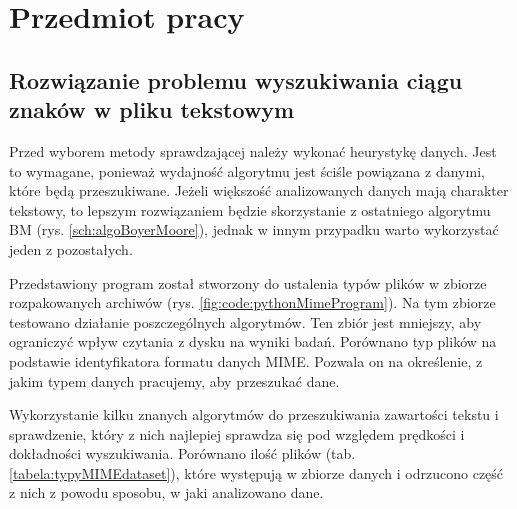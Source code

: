 \chapter{Przedmiot pracy}



\section{Rozwiązanie problemu wyszukiwania ciągu znaków w pliku tekstowym}

Przed wyborem metody sprawdzającej należy wykonać heurystykę danych. Jest to 
wymagane, ponieważ wydajność algorytmu jest ściśle powiązana z danymi, które
będą przeszukiwane. Jeżeli większość analizowanych danych mają charakter
tekstowy, to lepszym rozwiązaniem będzie skorzystanie z ostatniego algorytmu BM
(rys. \ref{sch:algoBoyerMoore}), jednak w innym przypadku warto wykorzystać jeden z 
pozostałych.

Przedstawiony program został stworzony do ustalenia typów plików w zbiorze 
rozpakowanych archiwów (rys. \ref{fig:code:pythonMimeProgram}). Na tym zbiorze testowano działanie poszczególnych algorytmów.
Ten zbiór jest mniejszy, aby ograniczyć wpływ czytania z dysku na wyniki badań. 
Porównano typ plików na podstawie identyfikatora formatu danych MIME. Pozwala
on na określenie, z jakim typem danych pracujemy, aby przeszukać dane.

Wykorzystanie kilku znanych algorytmów do przeszukiwania zawartości
tekstu i sprawdzenie, który z nich najlepiej sprawdza się pod względem prędkości
i dokładności wyszukiwania. Porównano ilość plików (tab. \ref{tabela:typyMIMEdataset}),
które występują w zbiorze danych i odrzucono część z nich z powodu sposobu, w jaki
analizowano dane.

